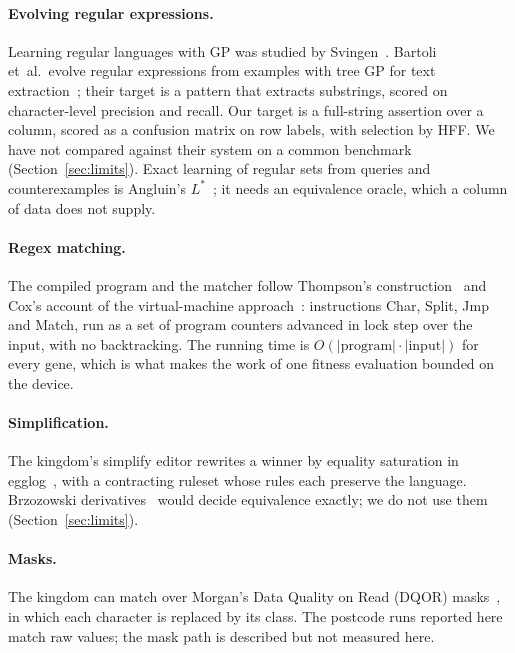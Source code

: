 \documentclass[sigconf,nonacm]{acmart}
\begin{document}
\paragraph{Evolving regular expressions.} Learning regular languages with GP
was studied by Svingen~\cite{svingen1998regular}. Bartoli et~al.\ evolve regular
expressions from examples with tree GP for text
extraction~\cite{bartoli2012regex,bartoli2016regex}; their target is a pattern
that extracts substrings, scored on character-level precision and recall. Our
target is a full-string assertion over a column, scored as a confusion matrix on
row labels, with selection by HFF. We have not compared against their system on
a common benchmark (Section~\ref{sec:limits}). Exact learning of regular sets
from queries and counterexamples is Angluin's $L^*$~\cite{angluin1987lstar}; it
needs an equivalence oracle, which a column of data does not supply.

\paragraph{Regex matching.} The compiled program and the matcher follow
Thompson's construction~\cite{thompson1968regex} and Cox's account of the
virtual-machine approach~\cite{cox2007regex,cox2009regexvm}: instructions
\textsf{Char}, \textsf{Split}, \textsf{Jmp} and \textsf{Match}, run as a set of
program counters advanced in lock step over the input, with no backtracking.
The running time is $O(|\text{program}|\cdot|\text{input}|)$ for every gene, which
is what makes the work of one fitness evaluation bounded on the device.

\paragraph{Simplification.} The kingdom's simplify editor rewrites a winner by
equality saturation in egglog~\cite{egglog}, with a contracting ruleset whose
rules each preserve the language. Brzozowski derivatives~\cite{brzozowski1964derivatives}
would decide equivalence exactly; we do not use them (Section~\ref{sec:limits}).

\paragraph{Masks.} The kingdom can match over Morgan's Data Quality on Read
(DQOR) masks~\cite{morgan2017bytefreq,morgan2017spark}, in which each character is
replaced by its class. The postcode runs reported here match raw values; the
mask path is described but not measured here.
\end{document}

